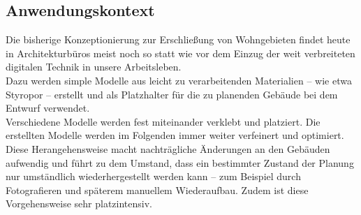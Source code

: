 \subsection{Anwendungskontext}\label{sec:Anwendungskontext} 
Die bisherige Konzeptionierung zur Erschließung von Wohngebieten findet heute in Architekturbüros meist noch so statt wie vor dem Einzug der weit verbreiteten digitalen Technik in unsere Arbeitsleben.\\
Dazu werden simple Modelle aus leicht zu verarbeitenden Materialien -- wie etwa Styropor -- erstellt und als Platzhalter für die zu planenden Gebäude bei dem Entwurf verwendet.\\
Verschiedene Modelle werden fest miteinander verklebt und platziert. Die erstellten Modelle werden im Folgenden immer weiter verfeinert und optimiert. 
Diese Herangehensweise macht nachträgliche Änderungen an den Gebäuden aufwendig und führt zu dem Umstand, dass ein bestimmter Zustand der Planung nur umständlich wiederhergestellt werden kann -- zum Beispiel durch Fotografieren und späterem manuellem Wiederaufbau. Zudem ist diese Vorgehensweise sehr platzintensiv.\\




